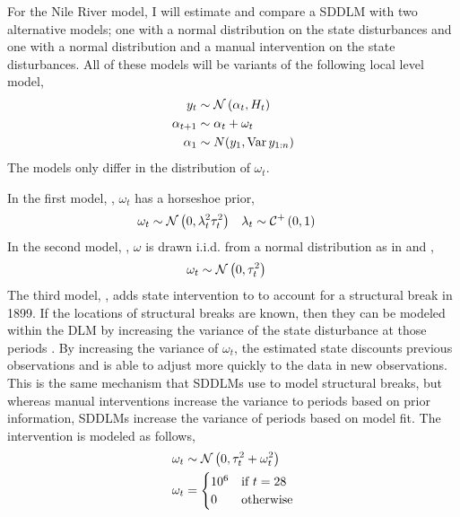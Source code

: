 \documentclass{article}
\begin{document}
For the Nile River model, I will estimate and compare a SDDLM with two alternative models; one with a normal distribution on the state disturbances and one with a normal distribution and a manual intervention on the state disturbances.
All of these models will be variants of the following local level model,
\begin{equation}
  \label{eq:21}
  \begin{aligned}[t]
    y_{t} &\sim \mathcal{N}\left(\alpha_{t}, H_{t}\right) \\
    \alpha_{t + 1} &\sim \alpha_{t} + \omega_{t} \\
    \alpha_{1} &\sim N(y_{1}, \operatorname{Var} y_{1:n})
  \end{aligned}
\end{equation}
The models only differ in the distribution of $\omega_{t}$.

In the first model, , $\omega_{t}$ has a horseshoe prior,
\begin{equation}
  \label{eq:22}
  \begin{aligned}[t]
    \omega_{t} & \sim \mathcal{N}\left(0, \lambda^{2}_{t} \tau_{t}^{2}\right) & \lambda_{t} & \sim \mathcal{C}^{+}\left(0, 1\right)
  \end{aligned}
\end{equation}
In the second model, , $\omega$ is  drawn i.i.d. from a normal distribution as in \textcite{DurbinKoopman2001} and \textcite{petris2011state},
\begin{equation}
  \label{eq:9}
  \begin{aligned}[t]
    \omega_{t} & \sim \mathcal{N}\left(0, \tau_{t}^{2}\right)
  \end{aligned}
\end{equation}
The third model, , adds state intervention to  to account for a structural break in 1899.
If the locations of structural breaks are known, then they can be modeled within the DLM by increasing the variance of the state disturbance at those periods \textcite[Chapter 11][]{WestHarrison1997}.
By increasing the variance of $\omega_{t}$, the estimated state discounts previous observations and is able to adjust more quickly to the data in new observations.
This is the same mechanism that SDDLMs use to model structural breaks, but whereas manual interventions increase the variance to periods based on prior information, SDDLMs increase the variance of periods based on model fit.
The intervention is modeled as follows,
\begin{equation}
  \label{eq:12}
  \begin{aligned}[t]
    \omega_{t} & \sim \mathcal{N}\left(0, \tau_{t}^{2} + \omega_{t}^{2}\right) \\
    \omega_{t} & = 
    \begin{cases}
      10^{6} & \text{if $t = 28$} \\
      0 & \text{otherwise}
    \end{cases}
  \end{aligned}
\end{equation}
\end{document}
